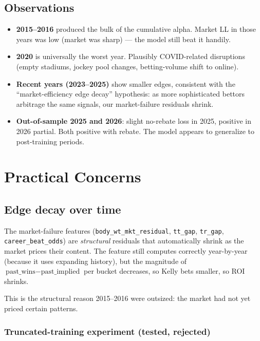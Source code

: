 \documentclass[11pt]{article}
\begin{document}
\subsection{Observations}

\begin{itemize}\item \textbf{2015--2016} produced the bulk of the cumulative alpha.
      Market LL in those years was low (market was sharp) --- the
      model still beat it handily.
\item \textbf{2020} is universally the worst year. Plausibly
      COVID-related disruptions (empty stadiums, jockey pool changes,
      betting-volume shift to online).
\item \textbf{Recent years (2023--2025)} show smaller edges, consistent
      with the ``market-efficiency edge decay'' hypothesis: as more
      sophisticated bettors arbitrage the same signals, our
      market-failure residuals shrink.
\item \textbf{Out-of-sample 2025 and 2026}: slight no-rebate loss in
      2025, positive in 2026 partial. Both positive with rebate. The
      model appears to generalize to post-training periods.
\end{itemize}

\section{Practical Concerns}

\subsection{Edge decay over time}

The market-failure features (\texttt{body\_wt\_mkt\_residual},
\texttt{tt\_gap}, \texttt{tr\_gap}, \texttt{career\_beat\_odds}) are
\emph{structural} residuals that automatically shrink as the market
prices their content. The feature still computes correctly year-by-year
(because it uses expanding history), but the magnitude of
$\text{past\_wins} - \text{past\_implied}$ per bucket decreases, so
Kelly bets smaller, so ROI shrinks.

This is the structural reason 2015--2016 were outsized: the market had
not yet priced certain patterns.

\subsubsection*{Truncated-training experiment (tested, rejected)}
\end{document}
